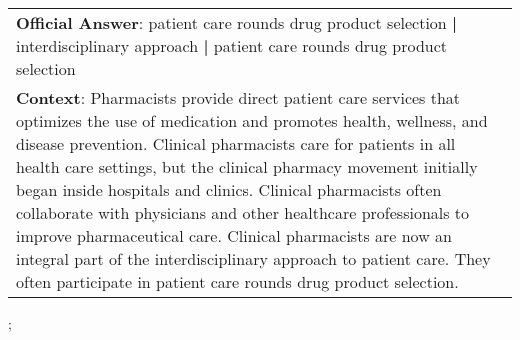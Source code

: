 \begin{figure*}[ht]
{\begin{tabular}{p{}}
            \textbf{Official Answer}: patient care rounds drug product selection \textbf{|} interdisciplinary approach \textbf{|} patient care rounds drug product selection                                                                                                                                                                                                                                                                                                                                                                                                                                                     \\
            \textbf{Context}: Pharmacists provide direct patient care services that optimizes the use of medication and promotes health, wellness, and disease prevention. Clinical pharmacists care for patients in all health care settings, but the clinical pharmacy movement initially began inside hospitals and clinics. Clinical pharmacists often collaborate with physicians and other healthcare professionals to improve pharmaceutical care. Clinical pharmacists are now an integral part of the interdisciplinary approach to patient care. They often participate in patient care rounds drug product selection. \\
        \end{tabular}
    };
    \label{fig:ex-5726e3c4dd62a815002e9407}
\end{figure*}

